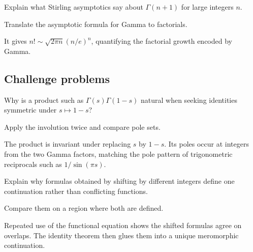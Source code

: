 \begin{exercise}\label{exr:iv19-expand-14}
Explain what Stirling asymptotics say about \(\Gamma(n+1)\) for large integers \(n\).
\end{exercise}
\begin{hint}
Translate the asymptotic formula for Gamma to factorials.
\end{hint}
\begin{solution}
It gives \(n!\sim\sqrt{2\pi n}(n/e)^n\), quantifying the factorial growth encoded by Gamma.
\end{solution}

\subsection*{Challenge problems}

\begin{exercise}\label{exr:iv19-expand-15}
Why is a product such as \(\Gamma(s)\Gamma(1-s)\) natural when seeking identities symmetric under \(s\mapsto1-s\)?
\end{exercise}
\begin{hint}
Apply the involution twice and compare pole sets.
\end{hint}
\begin{solution}
The product is invariant under replacing \(s\) by \(1-s\). Its poles occur at integers from the two Gamma factors, matching the pole pattern of trigonometric reciprocals such as \(1/\sin(\pi s)\).
\end{solution}

\begin{exercise}\label{exr:iv19-expand-16}
Explain why formulas obtained by shifting by different integers define one continuation rather than conflicting functions.
\end{exercise}
\begin{hint}
Compare them on a region where both are defined.
\end{hint}
\begin{solution}
Repeated use of the functional equation shows the shifted formulas agree on overlaps. The identity theorem then glues them into a unique meromorphic continuation.
\end{solution}

